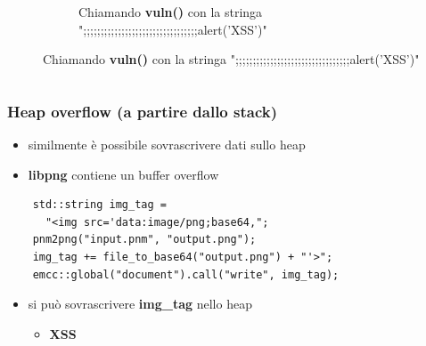 \documentclass{beamer}
\begin{document}
\begin{frame}
\begin{columns}
\begin{column}{0.45\textwidth}
\begin{figure}[htbp]
\begin{figure}
          \caption{Chiamando \textbf{vuln()} con la stringa
          ";;;;;;;;;;;;;;;;;;;;;;;;;;;;;;;;;alert('XSS')"}
        \end{figure}
        \end{figure}
    \end{column}
  \end{columns}
\end{frame}

\begin{frame}[fragile]
  \frametitle{Heap overflow (a partire dallo stack)}
  \begin{itemize}
    \item similmente è possibile sovrascrivere dati sullo heap
    \pause
    \item \textbf{libpng} contiene un buffer overflow 
  \pause
  \end{itemize}
  \vspace{0.15in}
  \begin{verbatim}
    std::string img_tag = 
      "<img src='data:image/png;base64,";
    pnm2png("input.pnm", "output.png");        
    img_tag += file_to_base64("output.png") + "'>";
    emcc::global("document").call("write", img_tag);
  \end{verbatim}
  \vspace{0.15in}
  \pause
  \begin{itemize}
    \item si può sovrascrivere \textbf{img\_tag} nello heap    
    \begin{itemize}
      \item \textbf{XSS}
    \end{itemize}
  \end{itemize}
\end{frame}
\end{document}

